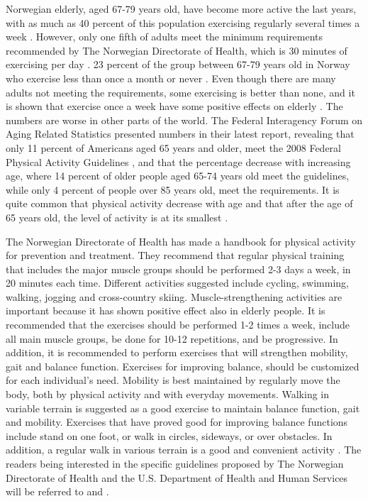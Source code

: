 Norwegian elderly, aged  67-79 years old, have become more active the last years, with as much as 40 percent of this population exercising regularly several times a week \cite{statisticsnorway}. However, only one fifth of adults meet the minimum requirements recommended by The Norwegian Directorate of Health, which is 30 minutes of exercising per day \cite{statistikknorge12}. 23 percent of the group between 67-79 years old in Norway who exercise less than once a month or never \cite{statisticsnorway}. Even though there are many adults not meeting the requirements, some exercising is better than none, and it is shown that exercise once a week have some positive effects on elderly \cite{gruppetrening-trheim}. The numbers are worse in other parts of the world.  The Federal Interagency Forum on Aging Related Statistics \cite{olderamericans} presented numbers in their latest report, revealing that only 11 percent of Americans aged 65 years and older, meet the 2008 Federal Physical Activity Guidelines \cite{guidelines}, and that the percentage decrease with increasing age, where 14 percent of older people aged 65-74 years old meet the guidelines, while only 4 percent of people over 85 years old, meet the requirements.  It is quite common that physical activity decrease with age and that after the age of 65 years old, the level of activity is at its smallest \cite{schutzer}. 
 
The Norwegian Directorate of Health has made a handbook for physical activity for prevention and treatment. They recommend that regular physical training that includes the major muscle groups should be performed 2-3 days a week, in 20 minutes each time. Different activities suggested include cycling, swimming, walking, jogging and cross-country skiing. Muscle-strengthening activities are important because it has shown positive effect also in elderly people. It is recommended that the exercises should be performed 1-2 times a week, include all main muscle groups, be done for 10-12 repetitions, and be progressive.  In addition, it is recommended to perform exercises that will strengthen mobility, gait and balance function. Exercises for improving balance, should be customized for each individual's need. Mobility is best maintained by regularly move the body, both by physical activity and with everyday movements. Walking in variable terrain is suggested as a good exercise to maintain balance function, gait and mobility. Exercises that have proved good for improving balance functions include stand on one foot, or walk in circles, sideways, or over obstacles. In addition, a regular walk in various terrain is a good and convenient activity \cite{aktivitetsbok}.  The readers being interested in the specific guidelines proposed by The Norwegian Directorate of Health and the U.S. Department of Health and Human Services will be referred to  \cite{aktivitetsbok} and \cite{guidelines}. 

